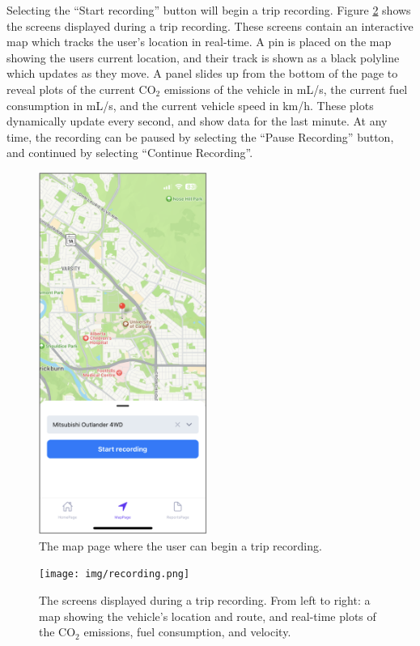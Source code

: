\documentclass[11pt, oneside]{article}
\begin{document}
Selecting the ``Start recording'' button will begin a trip recording.  Figure \ref{fig:recording} shows the screens displayed during a trip recording.  These screens contain an interactive map which tracks the user's location in real-time.  A pin is placed on the map showing the users current location, and their track is shown as a black polyline which updates as they move.  A panel slides up from the bottom of the page to reveal plots of the current CO$_2$ emissions of the vehicle in mL/s, the current fuel consumption in mL/s, and the current vehicle speed in km/h.  These plots dynamically update every second, and show data for the last minute.  At any time, the recording can be paused by selecting the ``Pause Recording'' button, and continued by selecting ``Continue Recording''.  
\begin{figure}[!t]
\centerline{\includegraphics[width=5.5cm]{img/mapinit.png}}
\caption{\label{fig:mappage}The map page where the user can begin a trip recording.}
\end{figure}
\begin{figure}[H]
\centerline{\texttt{[image: img/recording.png]}}
\caption{\label{fig:recording}The screens displayed during a trip recording.  From left to right: a map showing the vehicle's location and route, and real-time plots of the CO$_2$ emissions, fuel consumption, and velocity.}
\end{figure}
\end{document}
